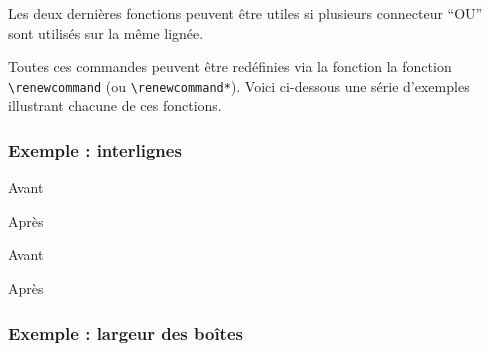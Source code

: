 		Les deux dernières fonctions peuvent être utiles si plusieurs connecteur ``OU'' sont utilisés sur la même lignée.

		Toutes ces commandes peuvent être redéfinies via la fonction la fonction {\color{blue}\verb'\renewcommand'} (ou {\color{blue}\verb'\renewcommand*'}).
		Voici ci-dessous une série d'exemples illustrant chacune de ces fonctions.


		\subsubsection{Exemple : interlignes}\label{interligne}

\begin{code}
\begin{fast}{Avant}	%
\end{fast}

\renewcommand*{\fastInterligne}{1cm}	%
\begin{fast}{Après}
\end{fast}
\fastReset	%
\end{code}
		\cqd
\begin{exemple}
\begin{fast}{Avant}	%
\end{fast}
\renewcommand*{\fastInterligne}{1cm}	%
\begin{fast}{Après}
\end{fast}
\fastReset	%
\end{exemple}



		\subsubsection{Exemple : largeur des boîtes}\label{largeur}


